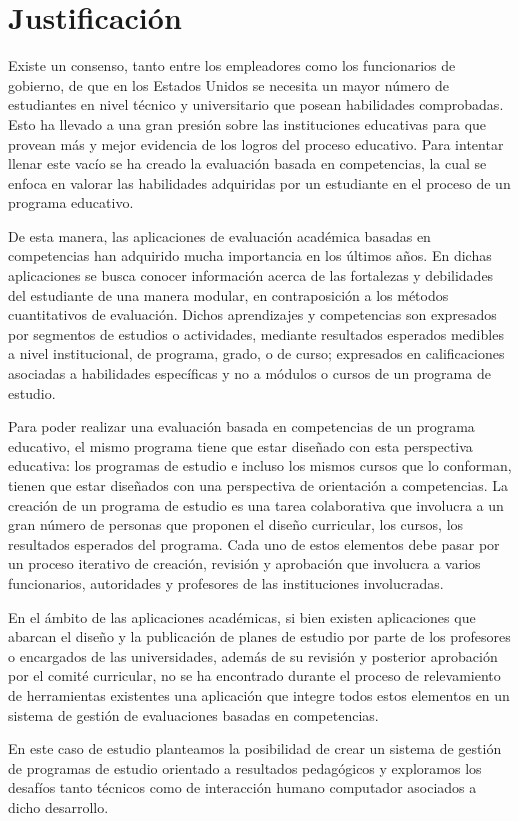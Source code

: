 \section{Justificación}
Existe un consenso, tanto entre los empleadores como los funcionarios de gobierno, de que en los Estados Unidos se necesita un mayor número de estudiantes en nivel técnico y universitario que posean habilidades comprobadas\citep{kuh_knowing_2014}. Esto ha llevado a una gran presión sobre las instituciones educativas para que provean más y mejor evidencia de los logros del proceso educativo\citep{kuh_knowing_2014}. Para intentar llenar este vacío se ha creado la evaluación basada en competencias, la cual se enfoca en valorar las habilidades adquiridas por un estudiante en el proceso de un programa educativo\citep{cartwright2009student}.
 
De esta manera, las aplicaciones de evaluación académica basadas en competencias han adquirido mucha importancia en los últimos años\citep{barrio_minton_evaluating_2016}. En dichas aplicaciones se busca conocer información acerca de las fortalezas y debilidades del estudiante de una manera modular, en contraposición a los métodos cuantitativos de evaluación. Dichos aprendizajes y competencias son expresados por segmentos de estudios o actividades, mediante resultados esperados medibles a nivel institucional, de programa, grado, o de curso; expresados en calificaciones asociadas a habilidades específicas y no a módulos o cursos de un programa de estudio\citep{kuh_using_2015}. 
 
Para poder realizar una evaluación basada en competencias de un programa educativo, el mismo programa tiene que estar diseñado con esta perspectiva educativa: los programas de estudio e incluso los mismos cursos que lo conforman, tienen que estar diseñados con una perspectiva de orientación a competencias\citep{lalor_ensuring_2017}. La creación de un programa de estudio es una tarea colaborativa que involucra a un gran número de personas que proponen el diseño curricular, los cursos, los resultados esperados del programa. Cada uno de estos elementos debe pasar por un proceso iterativo de creación, revisión y aprobación que involucra a varios funcionarios, autoridades y profesores de las instituciones involucradas\citep{boyle_curriculum_2016}. 
 
En el ámbito de las aplicaciones académicas, si bien existen aplicaciones que abarcan el diseño y la publicación de planes de estudio por parte de los profesores o encargados de las universidades, además de su revisión y posterior aprobación por el comité curricular, no se ha encontrado durante el proceso de relevamiento de herramientas existentes una aplicación que integre todos estos elementos en un sistema de gestión de evaluaciones basadas en competencias\citep{curricunet_webpage}\citep{courseleaf_webpage}\citep{deca_webpage}.
 
En este caso de estudio\citep{runeson2012case} planteamos la posibilidad de crear un sistema de gestión de programas de estudio orientado a resultados pedagógicos y exploramos los desafíos tanto técnicos como de interacción humano computador asociados a dicho desarrollo.